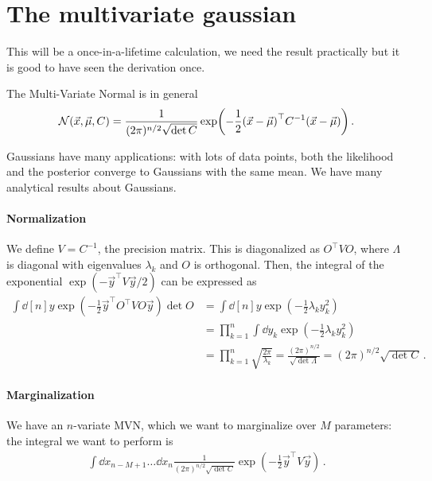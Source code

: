 \documentclass[main.tex]{subfiles}
\begin{document}
\section{The multivariate gaussian}


This will be a once-in-a-lifetime calculation, we need the result practically but it is good to have seen the derivation once. 

The Multi-Variate Normal is in general 
%
\begin{align}
\mathcal{N} (\vec{x}, \vec{\mu}, C) = 
\frac{1}{(2 \pi )^{n/2} \sqrt{\det C}}
\exp(- \frac{1}{2} \qty(\vec{x} - \vec{\mu})^{\top} C^{-1} (\vec{x} - \vec{\mu}))
\,.
\end{align}

Gaussians have many applications: with lots of data points, both the likelihood and the posterior converge to Gaussians with the same mean.
We have many analytical results about Gaussians.

\paragraph{Normalization}

We define \(V = C^{-1}\), the precision matrix. 
This is diagonalized as \(O^{\top} V O\), where \(\Lambda \) is diagonal with eigenvalues \(\lambda _k\) and \(O\) is orthogonal. 
Then, the integral of the exponential \(\exp( -\vec{y}^{\top} V \vec{y}/2)\) can be expressed as 
%
\begin{align}
\int \dd[n]{y} \exp(- \frac{1}{2} \vec{y}^{\top} O^{\top} V O \vec{y}) \det O &= 
\int \dd[n]{y} \exp(- \frac{1}{2} \lambda _k y_k^2) 
 \\
&= \prod_{k=1}^{n} \int \dd{y}_k \exp(- \frac{1}{2} \lambda _k y_k^2)   \\
&= \prod_{k=1}^{n} \sqrt{\frac{2 \pi }{\lambda _k}} = \frac{(2\pi)^{n/2}}{\sqrt{\det \Lambda }} = (2 \pi )^{n/2} \sqrt{\det C} 
\,.
\end{align}

\paragraph{Marginalization}

We have an \(n\)-variate MVN, which we want to marginalize over \(M\) parameters: the integral we want to perform is 
%
\begin{align}
\int \dd{x_{n-M+1}} \dots \dd{x_n} \frac{1}{(2 \pi )^{n/2} \sqrt{\det C}} \exp(- \frac{1}{2} \vec{y}^{\top} V \vec{y})
\,.
\end{align}
\end{document}
